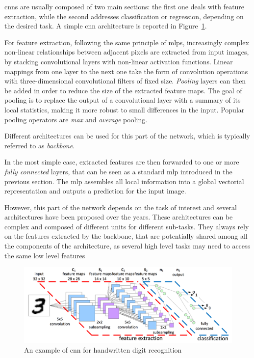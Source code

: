 \documentclass[%
    corpo=12pt,
    twoside,
    stile=classica,   
    tipotesi=magistrale,
    evenboxes,
    english,
	numerazioneromana,
]{toptesi}
\begin{document}
\bigskip
\Glspl{cnn} are usually composed of two main sections: the first one deals with feature extraction, while the second addresses classification or regression, depending on the desired task. A simple \gls{cnn} architecture is reported in Figure~\ref{fig:cnn}.

\medskip
For feature extraction, following the same principle of \glspl{mlp}, increasingly complex non-linear relationships between adjacent pixels are extracted from input images, by stacking convolutional layers with non-linear activation functions. Linear mappings from one layer to the next one take the form of convolution operations with three-dimensional convolutional filters of fixed size. \textit{Pooling} layers can then be added in order to reduce the size of the extracted feature maps. The goal of pooling is to replace the output of a convolutional layer with a summary of its local statistics, making it more robust to small differences in the input. Popular pooling operators are \textit{max} and \textit{average} pooling.

Different architectures can be used for this part of the network, which is typically referred to as \textit{backbone}.

\medskip
In the most simple case, extracted features are then forwarded to one or more \textit{fully connected} layers, that can be seen as a standard \gls{mlp} introduced in the previous section. The \gls{mlp} assembles all local information into a global vectorial representation and outputs a prediction for the input image.

However, this part of the network depends on the task of interest and several architectures have been proposed over the years. These architectures can be complex and composed of different units for different sub-tasks. They always rely on the features extracted by the backbone, that are potentially shared among all the components of the architecture, as several high level tasks may need to access the same low level features

\begin{figure}
	\centering
	\includegraphics[width=.95\linewidth]{imgs/cnn.png}
	\caption{An example of \gls{cnn} for handwritten digit recognition}
	\label{fig:cnn}
\end{figure}
\end{document}
